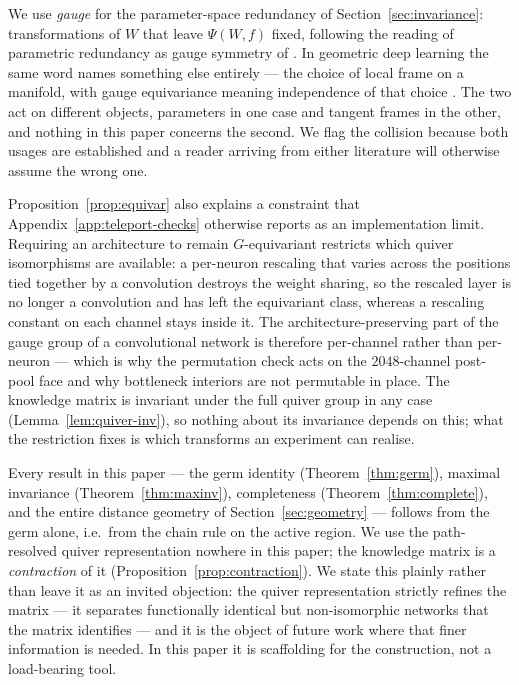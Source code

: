 \begin{remark}\label{rem:gauge-collision}
We use \emph{gauge} for the parameter-space redundancy of
Section~\ref{sec:invariance}: transformations of $W$ that leave $\Psi(W\!,f)$
fixed, following the reading of parametric redundancy as gauge symmetry of
\citet{hashimoto2024unification}. In geometric deep learning the same word names
something else entirely --- the choice of local frame on a manifold, with gauge
equivariance meaning independence of that choice
\citep{cohen2019gauge,bronstein2021geometric}. The two act on different objects,
parameters in one case and tangent frames in the other, and nothing in this
paper concerns the second. We flag the collision because both usages are
established and a reader arriving from either literature will otherwise assume
the wrong one.
\end{remark}

\begin{remark}\label{rem:channelperm}
Proposition~\ref{prop:equivar} also explains a constraint that
Appendix~\ref{app:teleport-checks} otherwise reports as an implementation limit.
Requiring an architecture to remain $G$-equivariant restricts which quiver
isomorphisms are available: a per-neuron rescaling that varies across the
positions tied together by a convolution destroys the weight sharing, so the
rescaled layer is no longer a convolution and has left the equivariant class,
whereas a rescaling constant on each channel stays inside it. The
architecture-preserving part of the gauge group of a convolutional network is
therefore per-channel rather than per-neuron --- which is why the permutation
check acts on the $2048$-channel post-pool face and why bottleneck interiors are
not permutable in place. The knowledge matrix is invariant under the full quiver
group in any case (Lemma~\ref{lem:quiver-inv}), so nothing about its invariance
depends on this; what the restriction fixes is which transforms an experiment
can realise.
\end{remark}

\begin{remark}
\label{rem:series-positioning}
Every result in this paper --- the germ identity (Theorem~\ref{thm:germ}), maximal
invariance (Theorem~\ref{thm:maxinv}), completeness (Theorem~\ref{thm:complete}),
and the entire distance geometry of Section~\ref{sec:geometry} --- follows from
the germ alone, i.e.\ from the chain rule on the active region. We use the
path-resolved quiver representation nowhere in this paper; the knowledge matrix is a
\emph{contraction} of it (Proposition~\ref{prop:contraction}). We state this
plainly rather than leave it as an invited objection: the quiver representation
strictly refines the matrix --- it separates functionally identical but
non-isomorphic networks that the matrix identifies --- and it is the object of
future work where that finer information is needed. In this paper it
is scaffolding for the construction, not a load-bearing tool.
\end{remark}

